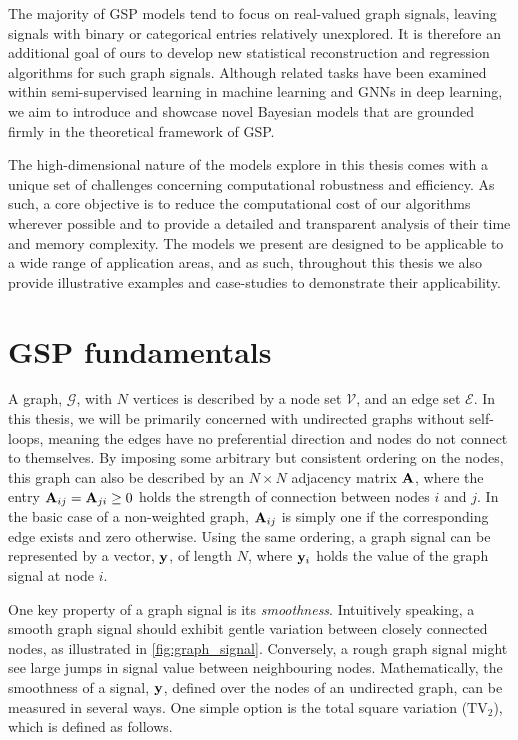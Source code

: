
The majority of GSP models tend to focus on real-valued graph signals, leaving signals with binary or categorical entries relatively unexplored. It is therefore an additional goal of ours to develop new statistical reconstruction and regression algorithms for such graph signals. Although related tasks have been examined within semi-supervised learning in machine learning and GNNs in deep learning, we aim to introduce and showcase novel Bayesian models that are grounded firmly in the theoretical framework of GSP.


The high-dimensional nature of the models explore in this thesis comes with a unique set of challenges concerning computational robustness and efficiency. As such, a core objective is to reduce the computational cost of our algorithms wherever possible and to provide a detailed and transparent analysis of their time and memory complexity. The models we present are designed to be applicable to a wide range of application areas, and as such, throughout this thesis we also provide illustrative examples and case-studies to demonstrate their applicability. 

\newpage 


\section{GSP fundamentals}

\label{sec:fundamentals}

A graph, $\mathcal{G}$, with $N$ vertices is described by a node set $\mathcal{V}$, and an edge set $\mathcal{E}$. In this thesis, we will be primarily concerned with undirected graphs without self-loops, meaning the edges have no preferential direction and nodes do not connect to themselves. By imposing some arbitrary but consistent ordering on the nodes, this graph can also be described by an $N \times N$ adjacency matrix $\mathbf{A}$, where the entry $\mathbf{A}_{ij} = \mathbf{A}_{ji} \geq 0$ holds the strength of connection between nodes $i$ and $j$. In the basic case of a non-weighted graph, $\mathbf{A}_{ij}$ is simply one if the corresponding edge exists and zero otherwise. Using the same ordering, a graph signal can be represented by a vector, $\mathbf{y}$, of length $N$, where $\mathbf{y}_i$ holds the value of the graph signal at node $i$. 

One key property of a graph signal is its \textit{smoothness}. Intuitively speaking, a smooth graph signal should exhibit gentle variation between closely connected nodes, as illustrated in \cref{fig:graph_signal}. Conversely, a rough graph signal might see large jumps in signal value between neighbouring nodes. Mathematically, the smoothness of a signal, $\mathbf{y}$, defined over the nodes of an undirected graph, can be measured in several ways. One simple option is the total square variation ($\text{TV}_2$), which is defined as follows. 

